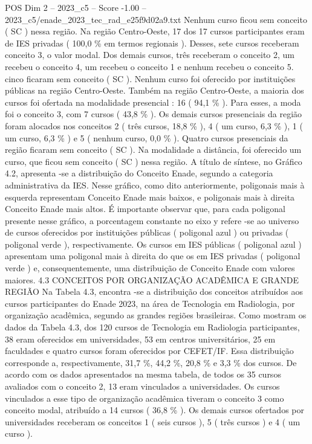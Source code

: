 \begin{textsample}{POS Dim 2 – 2023\_c5 – Score -1.00 – 2023\_c5/enade\_2023\_tec\_rad\_e25f9d02a9.txt}
Nenhum curso ficou sem conceito ( SC ) nessa região.
Na região Centro-Oeste, 17 dos 17 cursos participantes eram de IES privadas ( 100,0 \% em termos regionais ).
Desses, sete cursos receberam conceito 3, o valor modal.
Dos demais cursos, três receberam o conceito 2, um recebeu o conceito 4, um recebeu o conceito 1 e nenhum recebeu o conceito 5. cinco ficaram sem conceito ( SC ).
Nenhum curso foi oferecido por instituições públicas na região Centro-Oeste.
Também na região Centro-Oeste, a maioria dos cursos foi ofertada na modalidade presencial : 16 ( 94,1 \% ).
Para esses, a moda foi o conceito 3, com 7 cursos ( 43,8 \% ).
Os demais cursos presenciais da região foram alocados nos conceitos 2 ( três cursos, 18,8 \% ), 4 ( um curso, 6,3 \% ), 1 ( um curso, 6,3 \% ) e 5 ( nenhum curso, 0,0 \% ).
Quatro cursos presenciais da região ficaram sem conceito ( SC ).
Na modalidade a distância, foi oferecido um curso, que ficou sem conceito ( SC ) nessa região.
A título de síntese, no Gráfico 4.2, apresenta -se a distribuição do Conceito Enade, segundo a categoria administrativa da IES.
Nesse gráfico, como dito anteriormente, poligonais mais à esquerda representam Conceito Enade mais baixos, e poligonais mais à direita Conceito Enade mais altos.
É importante observar que, para cada poligonal presente nesse gráfico, a porcentagem constante no eixo y refere -se ao universo de cursos oferecidos por instituições públicas ( poligonal azul ) ou privadas ( poligonal verde ), respectivamente.
Os cursos em IES públicas ( poligonal azul ) apresentam uma poligonal mais à direita do que os em IES privadas ( poligonal verde ) e, consequentemente, uma distribuição de Conceito Enade com valores maiores. 4.3 CONCEITOS POR ORGANIZAÇÃO ACADÊMICA E GRANDE REGIÃO Na Tabela 4.3, encontra -se a distribuição dos conceitos atribuídos aos cursos participantes do Enade 2023, na área de Tecnologia em Radiologia, por organização acadêmica, segundo as grandes regiões brasileiras.
Como mostram os dados da Tabela 4.3, dos 120 cursos de Tecnologia em Radiologia participantes, 38 eram oferecidos em universidades, 53 em centros universitários, 25 em faculdades e quatro cursos foram oferecidos por CEFET/IF.
Essa distribuição corresponde a, respectivamente, 31,7 \%, 44,2 \%, 20,8 \% e 3,3 \% dos cursos.
De acordo com os dados apresentados na mesma tabela, de todos os 35 cursos avaliados com o conceito 2, 13 eram vinculados a universidades.
Os cursos vinculados a esse tipo de organização acadêmica tiveram o conceito 3 como conceito modal, atribuído a 14 cursos ( 36,8 \% ).
Os demais cursos ofertados por universidades receberam os conceitos 1 ( seis cursos ), 5 ( três cursos ) e 4 ( um curso ).

\end{textsample}
